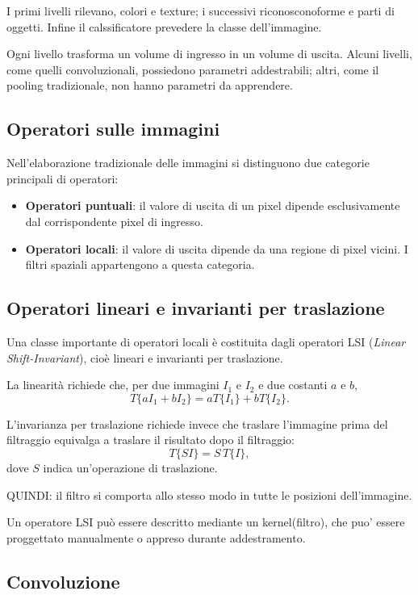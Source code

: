 \documentclass[11pt,a4paper]{article}
\begin{document}
I primi livelli rilevano, colori e texture; i successivi riconosconoforme e parti
di oggetti. Infine il calssificatore prevedere la classe dell'immagine.

Ogni livello trasforma un volume di ingresso in un volume di uscita.
Alcuni livelli, come quelli convoluzionali, possiedono parametri
addestrabili; altri, come il pooling tradizionale, non hanno parametri
da apprendere.

\subsection{Operatori sulle immagini}

Nell'elaborazione tradizionale delle immagini si distinguono due
categorie principali di operatori:

\begin{itemize}
    \item \textbf{Operatori puntuali}: il valore di uscita di un pixel
    dipende esclusivamente dal corrispondente pixel di ingresso.
    \item \textbf{Operatori locali}: il valore di uscita dipende da una
    regione di pixel vicini. I filtri spaziali appartengono a questa
    categoria.
\end{itemize}

\subsection{Operatori lineari e invarianti per traslazione}

Una classe importante di operatori locali è costituita dagli operatori
LSI (\textit{Linear Shift-Invariant}), cioè lineari e invarianti per
traslazione.

La linearità richiede che, per due immagini $I_1$ e $I_2$ e due
costanti $a$ e $b$,
\[
T\{aI_1+bI_2\}=aT\{I_1\}+bT\{I_2\}.
\]

L'invarianza per traslazione richiede invece che traslare l'immagine
prima del filtraggio equivalga a traslare il risultato dopo il filtraggio:
\[
T\{SI\}=S\,T\{I\},
\]
dove $S$ indica un'operazione di traslazione.

QUINDI: il filtro si comporta allo stesso modo in tutte le posizioni
dell'immagine.

Un operatore LSI può essere descritto mediante un kernel(filtro), che puo' essere proggettato 
manualmente o appreso durante addestramento.


\subsection{Convoluzione}
\end{document}
